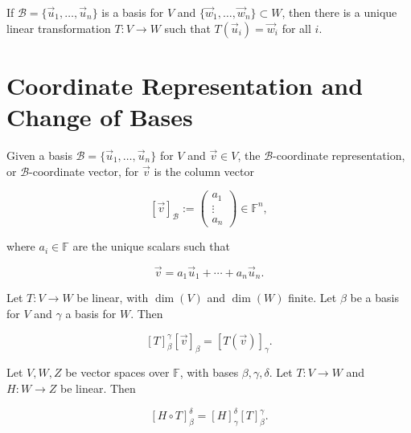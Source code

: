 \documentclass{article}
\newcommand{\secbreak}{\noindent \hrulefill \vspace{1cm}}
\begin{document}
\begin{theorem}
If \( \mathcal{B} = \{ \vec{u}_1, \ldots, \vec{u}_n \} \) is a basis for \( V \) and \(\{\vec{w}_1, \ldots, \vec{w}_n \} \subset W \), then there is a unique linear transformation \( T: V \to W \) such that \( T(\vec{u}_i) = \vec{w}_i \) for all \( i \).
\end{theorem}


\secbreak

\section*{Coordinate Representation and Change of Bases}

\begin{definition}
Given a basis \( \mathcal{B} = \{ \vec{u}_1, \ldots, \vec{u}_n \} \) for \( V \) and \( \vec{v} \in V \), the \(\mathcal{B}\)-coordinate representation, or \(\mathcal{B}\)-coordinate vector, for \(\vec{v}\) is the column vector

\[
[\vec{v}]_{\mathcal{B}} := \begin{pmatrix}
a_1 \\
\vdots \\
a_n
\end{pmatrix} \in \mathbb{F}^n,
\]

where \( a_i \in \mathbb{F} \) are the unique scalars such that 

\[
\vec{v} = a_1 \vec{u}_1 + \cdots + a_n \vec{u}_n.
\]
\end{definition}


\begin{theorem}
Let \( T: V \to W \) be linear, with \(\dim(V)\) and \(\dim(W)\) finite. Let \( \beta \) be a basis for \( V \) and \( \gamma \) a basis for \( W \). Then

\[
[T]_{\beta}^{\gamma} [\vec{v}]_{\beta} = [T(\vec{v})]_{\gamma}.
\]
\end{theorem}


\begin{theorem}
Let \( V, W, Z \) be vector spaces over \( \mathbb{F} \), with bases \( \beta, \gamma, \delta \). Let \( T: V \to W \) and \( H: W \to Z \) be linear. Then

\[
[H \circ T]_{\beta}^{\delta} = [H]_{\gamma}^{\delta} [T]_{\beta}^{\gamma}.
\]
\end{theorem}
\end{document}
